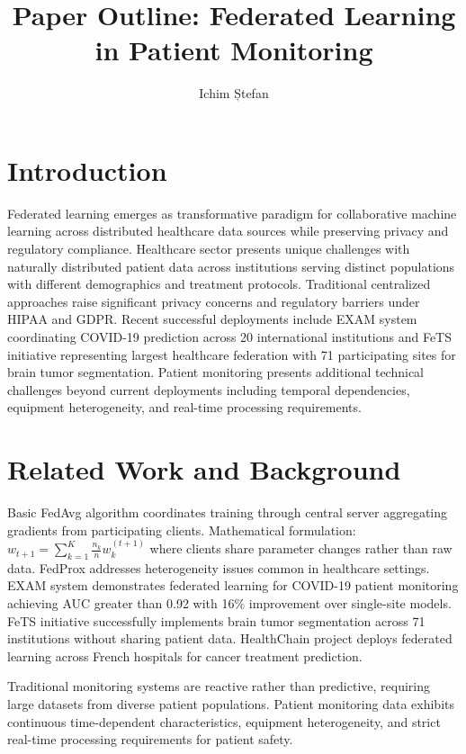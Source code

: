 \documentclass[8pt]{article}
\title{\textbf{Paper Outline: Federated Learning in Patient Monitoring}}
\author{Ichim Ștefan}
\date{}
\begin{document}
\maketitle

\section{Introduction}
Federated learning emerges as transformative paradigm for collaborative machine learning across distributed healthcare data sources while preserving privacy and regulatory compliance. Healthcare sector presents unique challenges with naturally distributed patient data across institutions serving distinct populations with different demographics and treatment protocols. Traditional centralized approaches raise significant privacy concerns and regulatory barriers under HIPAA and GDPR. Recent successful deployments include EXAM system coordinating COVID-19 prediction across 20 international institutions and FeTS initiative representing largest healthcare federation with 71 participating sites for brain tumor segmentation. Patient monitoring presents additional technical challenges beyond current deployments including temporal dependencies, equipment heterogeneity, and real-time processing requirements.

\section{Related Work and Background}
Basic FedAvg algorithm coordinates training through central server aggregating gradients from participating clients. Mathematical formulation: $w_{t+1} = \sum_{k=1}^{K} \frac{n_k}{n} w_k^{(t+1)}$ where clients share parameter changes rather than raw data. FedProx addresses heterogeneity issues common in healthcare settings.
EXAM system demonstrates federated learning for COVID-19 patient monitoring achieving AUC greater than 0.92 with 16\% improvement over single-site models. FeTS initiative successfully implements brain tumor segmentation across 71 institutions without sharing patient data. HealthChain project deploys federated learning across French hospitals for cancer treatment prediction.

Traditional monitoring systems are reactive rather than predictive, requiring large datasets from diverse patient populations. Patient monitoring data exhibits continuous time-dependent characteristics, equipment heterogeneity, and strict real-time processing requirements for patient safety.
\end{document}

